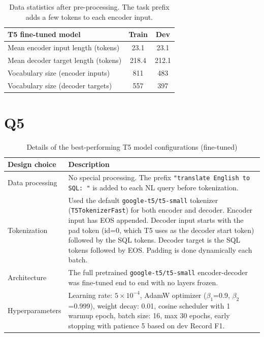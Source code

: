 \documentclass{article}
\begin{document}
\begin{table}[h!]
\centering
\begin{tabular}{lcc}
\toprule
\textbf{T5 fine-tuned model} & Train & Dev \\
\midrule
Mean encoder input length (tokens) & 23.1 & 23.1 \\
Mean decoder target length (tokens) & 218.4 & 212.1 \\
Vocabulary size (encoder inputs) & 811 & 483 \\
Vocabulary size (decoder targets) & 557 & 397 \\
\midrule
\bottomrule
\end{tabular}
\caption{Data statistics after pre-processing. The task prefix adds a few tokens to each encoder input.}
\label{tab:data_stats_after}
\end{table}

\newpage

\section*{Q5}\label{sec:t5}

\begin{table}[h!]
\centering
\begin{tabular}{p{3.5cm}p{10cm}}
\toprule
Design choice & Description \\
\midrule
Data processing & No special processing. The prefix \texttt{"translate English to SQL: "} is added to each NL query before tokenization. \\
Tokenization & Used the default \texttt{google-t5/t5-small} tokenizer (\texttt{T5TokenizerFast}) for both encoder and decoder. Encoder input has EOS appended. Decoder input starts with the pad token (id=0, which T5 uses as the decoder start token) followed by the SQL tokens. Decoder target is the SQL tokens followed by EOS. Padding is done dynamically each batch. \\
Architecture & The full pretrained \texttt{google-t5/t5-small} encoder-decoder was fine-tuned end to end with no layers frozen. \\
Hyperparameters & Learning rate: $5 \times 10^{-4}$, AdamW optimizer ($\beta_1$=0.9, $\beta_2$=0.999), weight decay: 0.01, cosine scheduler with 1 warmup epoch, batch size: 16, max 30 epochs, early stopping with patience 5 based on dev Record F1. \\
\bottomrule
\end{tabular}
\caption{Details of the best-performing T5 model configurations (fine-tuned)}
\label{tab:t5_results_ft}
\end{table}
\end{document}
